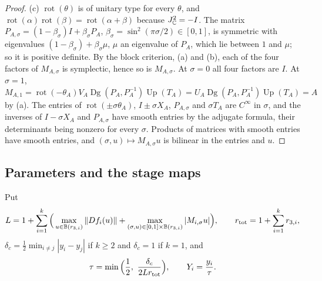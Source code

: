 \begin{proof}
(c) $\operatorname{rot}(\theta)$ is of unitary type for every $\theta$, and $\operatorname{rot}(\alpha)\operatorname{rot}(\beta)
=\operatorname{rot}(\alpha+\beta)$ because $J_{\mathbb{C}}^2=-I$. The matrix $P_{A,\sigma}=(1-\beta_\sigma)I+\beta_\sigma P_A$,
$\beta_\sigma=\sin^2(\pi\sigma/2)\in[0,1]$, is symmetric with eigenvalues $(1-\beta_\sigma)+\beta_\sigma\mu$, $\mu$ an eigenvalue of
$P_A$, which lie between $1$ and $\mu$; so it is positive definite. By the block criterion, (a) and (b), each of the four factors
of $M_{A,\sigma}$ is symplectic, hence so is $M_{A,\sigma}$. At $\sigma=0$ all four factors are $I$. At $\sigma=1$,
$M_{A,1}=\operatorname{rot}(-\theta_A)V_A\operatorname{Dg}(P_A,P_A^{-1})\operatorname{Up}(T_A)
=U_A\operatorname{Dg}(P_A,P_A^{-1})\operatorname{Up}(T_A)=A$ by (a). The entries of $\operatorname{rot}(\pm\sigma\theta_A)$,
$I\pm\sigma X_A$, $P_{A,\sigma}$ and $\sigma T_A$ are $C^\infty$ in $\sigma$, and the inverses of $I-\sigma X_A$ and
$P_{A,\sigma}$ have smooth entries by the adjugate formula, their determinants being nonzero for every $\sigma$. Products of
matrices with smooth entries have smooth entries, and $(\sigma,u)\mapsto M_{A,\sigma}u$ is bilinear in the entries and $u$.

\end{proof}



\subsection{Parameters and the stage maps}\label{sec:iso-parameters}

\begin{definition}[Parameters]\label{def:iso-parameters}
Put
\[
 L=1+\sum_{i=1}^k\Big(\max_{u\in\mathbb{B}(r_{3,i})}\|Df_i(u)\|+\max_{(\sigma,u)\in[0,1]\times\mathbb{B}(r_{3,i})}|M_{i,\sigma}u|\Big),
 \qquad r_{\rm tot}=1+\sum_{i=1}^kr_{3,i} ,
\]
$\delta_c=\frac12\min_{i\ne j}|y_i-y_j|$ if $k\ge2$ and $\delta_c=1$ if $k=1$, and
\[
 \tau=\min\Big(\frac12,\ \frac{\delta_c}{2Lr_{\rm tot}}\Big),\qquad Y_i=\frac{y_i}{\tau}.
\]
\end{definition}

